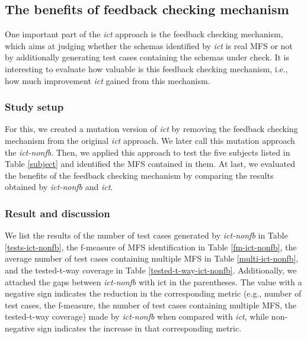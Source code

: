 \documentclass[journal,12pt,onecolumn,draftclsnofoot,]{IEEEtran}
\begin{document}
\subsection{The benefits of feedback checking mechanism}
One important part of the \emph{ict} approach is the feedback checking mechanism, which aims at judging whether the schemas identified by \emph{ict} is real MFS or not by additionally generating test cases containing the schemas under check. It is interesting to evaluate how valuable is this feedback checking mechanism, i.e., how much improvement \emph{ict} gained from this mechanism.
\subsubsection{Study setup}
For this, we created a mutation version of \emph{ict} by removing the feedback checking mechanism from the original \emph{ict} approach. We later call this mutation approach the \emph{ict-nonfb}.  Then, we applied this approach to test the five subjects listed in Table \ref{subject} and identified the MFS contained in them. At last, we evaluated the benefits of the feedback checking mechanism by comparing the results obtained by \emph{ict-nonfb} and \emph{ict}.


\subsubsection{Result and discussion}
We list the results of the number of test cases generated by \emph{ict-nonfb} in Table \ref{tests-ict-nonfb}, the f-measure of MFS identification in Table \ref{fm-ict-nonfb}, the average number of test cases containing multiple MFS in Table \ref{multi-ict-nonfb}, and the tested-t-way coverage in Table \ref{tested-t-way-ict-nonfb}. Additionally, we attached the gaps between \emph{ict-nonfb} with ict in the parentheses. The value with a negative sign indicates the reduction in the corresponding metric (e.g., number of test cases, the f-measure, the number of test cases containing multiple MFS, the tested-t-way coverage) made by \emph{ict-nonfb} when compared with \emph{ict}, while non-negative sign indicates the increase in that corresponding metric.
\end{document}
